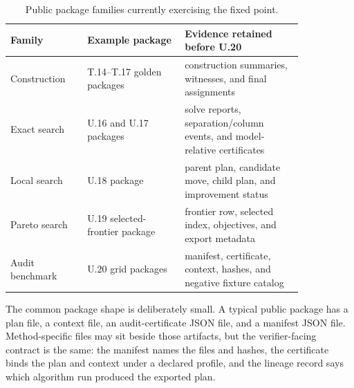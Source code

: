 \begin{table}[htbp]
\centering
\small
\begin{tabular}{p{0.22\linewidth}p{0.28\linewidth}p{0.34\linewidth}}
\toprule
Family & Example package & Evidence retained before U.20 \\
\midrule
Construction & T.14--T.17 golden packages & construction summaries, witnesses,
and final assignments \\
Exact search & U.16 and U.17 packages & solve reports, separation/column
events, and model-relative certificates \\
Local search & U.18 package & parent plan, candidate move, child plan, and
improvement status \\
Pareto search & U.19 selected-frontier package & frontier row, selected index,
objectives, and export metadata \\
Audit benchmark & U.20 grid packages & manifest, certificate, context, hashes,
and negative fixture catalog \\
\bottomrule
\end{tabular}
\caption{Public package families currently exercising the fixed point.}
\end{table}

The common package shape is deliberately small. A typical public package has a
plan file, a context file, an audit-certificate JSON file, and a manifest JSON
file. Method-specific files may sit beside those artifacts, but the
verifier-facing contract is the same: the manifest names the files and hashes,
the certificate binds the plan and context under a declared profile, and the
lineage record says which algorithm run produced the exported plan.
